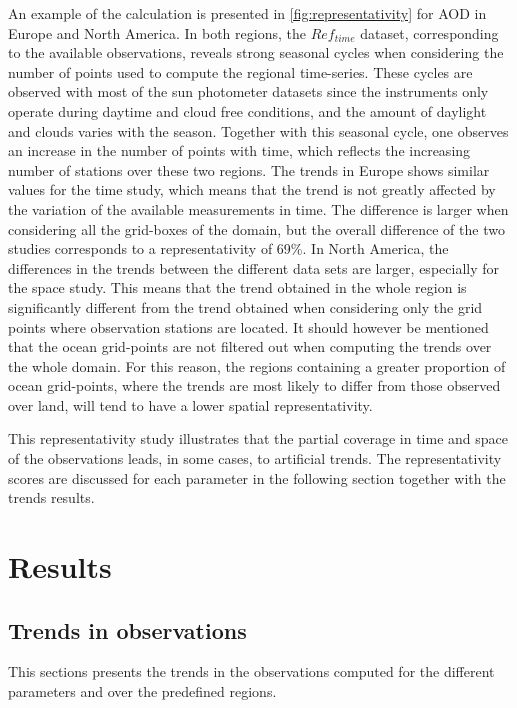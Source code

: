 \documentclass[journal abbreviation, manuscript]{copernicus}
\begin{document}
An example of the calculation is presented in \ref{fig:representativity} for AOD in Europe and North America. In both regions, the $Ref_{time}$ dataset, corresponding to the available observations, reveals strong seasonal cycles when considering the number of points used to compute the regional time-series. These cycles are observed with most of the sun photometer datasets since the instruments only operate during daytime and cloud free conditions, and the amount of daylight and clouds varies with the season. Together with this seasonal cycle, one observes an increase in the number of points with time, which reflects the increasing number of stations over these two regions. The trends in Europe shows similar values for the time study, which means that the trend is not greatly affected by the variation of the available measurements in time. The difference is larger when considering all the grid-boxes of the domain, but the overall difference of the two studies corresponds to a representativity of 69\%. In North America, the differences in the trends between the different data sets are larger, especially for the space study. This means that the trend obtained in the whole region is significantly different from the trend obtained when considering only the grid points where observation stations are located. It should however be mentioned that the ocean grid-points are not filtered out when computing the trends over the whole domain. For this reason, the regions containing a greater proportion of ocean grid-points, where the trends are most likely to differ from those observed over land, will tend to have a lower spatial representativity.

This representativity study illustrates that the partial coverage in time and space of the observations leads, in some cases, to artificial trends. The representativity scores are discussed for each parameter in the following section together with the trends results.

\section{Results}

\subsection{Trends in observations}
This sections presents the trends in the observations computed for the different parameters and over the predefined regions.
\end{document}
